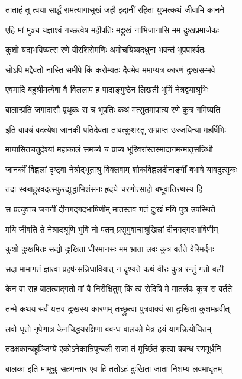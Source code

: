 \twolineshloka
{ताताहं तु त्वया सार्द्धं रामत्यागासुखं जहौ}
{इदानीं रहिता युष्मत्कथं जीवामि कानने}%

\twolineshloka
{एहि मां मुञ्च यज्ञाश्वं गच्छत्वेष महीपतिः}
{मद्दुःखं नाभिजानासि मम दुःखप्रमार्जकः}%

\twolineshloka
{कुशो यद्यभविष्यत्स रणे वीरशिरोमणिः}
{अमोचयिष्यदधुना भवन्तं भूपपार्श्वतः}%

\twolineshloka
{सोऽपि मद्दैवतो नास्ति समीपे किं करोम्यतः}
{दैवमेव ममाप्यत्र कारणं दुःखसम्भवे}%

\twolineshloka
{एवमादि बहुश्रीमत्येषा वै विललाप ह}
{पादाङ्गुष्ठेन लिखती भूमिं नेत्रद्वयाश्रुभिः}%

\twolineshloka
{बालान्प्रति जगादासौ पृथुकः स च भूपतिः}
{कथं मत्सुतमापात्य रणे कुत्र गमिष्यति}%

\twolineshloka
{इति वाक्यं वदत्येषा जानकी पतिदेवता}
{तावत्कुशस्तु सम्प्राप्त उज्जयिन्या महर्षिभिः}%

\twolineshloka
{माघासितचतुर्दश्यां महाकालं समर्च्य च}
{प्राप्य भूरिवरांस्तस्मादागमन्मातृसन्निधौ}%

\twolineshloka
{जानकीं विह्वलां दृष्ट्वा नेत्रोद्भूताश्रु विक्लवाम्}
{शोकविह्वलदीनाङ्गीं बभाषे यावदुत्सुकः}%

\twolineshloka
{तदा स्वबाहुरवदत्स्फुरद्युद्धाभिशंसनः}
{हृदये चरणोत्साहो बभूवातिरथस्य हि}%

\twolineshloka
{स प्रत्युवाच जननीं दीनगद्गदभाषिणीम्}
{मातस्तव गतं दुःखं मयि पुत्र उपस्थिते}%

\twolineshloka
{मयि जीवति ते नेत्रादश्रूणि भुवि नो पतन्}
{प्रसूमुवाचाश्रुखिन्नां दीनगद्गदभाषिणीम्}%

\twolineshloka
{कुशो दुःखमितः सद्यो दुःखितां धीरमानसः}
{मम भ्राता लवः कुत्र वर्तते वैरिमर्दनः}%

\twolineshloka
{सदा मामागतं ज्ञात्वा प्रहर्षन्सन्निधावियात्}
{न दृश्यते कथं वीरः कुत्र रन्तुं गतो बली}%

\twolineshloka
{केन वा सह बालत्वाद्गतो मां वै निरीक्षितुम्}
{किं त्वं रोदिषि मे मातर्लवः कुत्र स वर्तते}%

\twolineshloka
{तन्मे कथय सर्वं यत्तव दुःखस्य कारणम्}
{तच्छ्रुत्वा पुत्रवाक्यं सा दुःखिता कुशमब्रवीत्}%

\twolineshloka
{लवो धृतो नृपेणात्र केनचिद्धयरक्षिणा}
{बबन्ध बालको मेत्र हयं यागक्रियोचितम्}%

\twolineshloka
{तद्रक्षकान्बहूञ्जिग्ये एकोऽनेकान्रिपून्बली}
{राजा तं मूर्च्छितं कृत्वा बबन्ध रणमूर्धनि}%

\twolineshloka
{बालका इति मामूचुः सहगन्तार एव हि}
{ततोऽहं दुःखिता जाता निशम्य लवमाधृतम्}%


